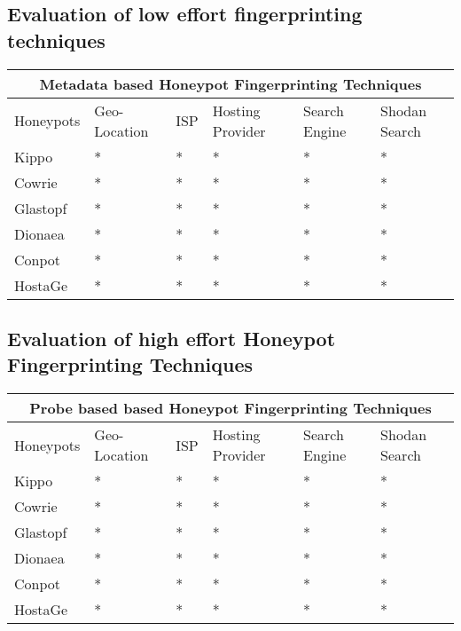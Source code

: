 \documentclass[../main.tex]{subfiles}
\begin{document}
 
\subsection{Evaluation of low effort fingerprinting techniques}
 
 
 \begin{tabular}{ |p{1.5cm}||p{1.2cm}|p{0.4cm}|p{1.2cm}|p{1.2cm}|p{1.2cm}| }
 \hline
 \multicolumn{6}{|c|}{Metadata based Honeypot Fingerprinting Techniques} \\
 \hline
 Honeypots & Geo-Location & ISP & Hosting Provider & Search Engine & Shodan Search\\
 \hline
 Kippo   & *  &* & * & * & * \\
 Cowrie  & *  &* & * & * & * \\
 Glastopf& *  &* & * & * & * \\
 Dionaea & *  &* & * & * & * \\
 Conpot  & *  &* & * & * & * \\
 HostaGe & *  &* & * & * & * \\
 \hline
\end{tabular}




\subsection{Evaluation of high effort  Honeypot Fingerprinting Techniques}



\begin{tabular}{ |p{1.5cm}||p{1.2cm}|p{0.4cm}|p{1.2cm}|p{1.2cm}|p{1.2cm}| }
 \hline
 \multicolumn{6}{|c|}{Probe based based Honeypot Fingerprinting Techniques} \\
 \hline
 Honeypots & Geo-Location & ISP & Hosting Provider & Search Engine & Shodan Search\\
 \hline
 Kippo   & *  &* & * & * & * \\
 Cowrie  & *  &* & * & * & * \\
 Glastopf& *  &* & * & * & * \\
 Dionaea & *  &* & * & * & * \\
 Conpot  & *  &* & * & * & * \\
 HostaGe & *  &* & * & * & * \\
 \hline
\end{tabular}
\end{document}

